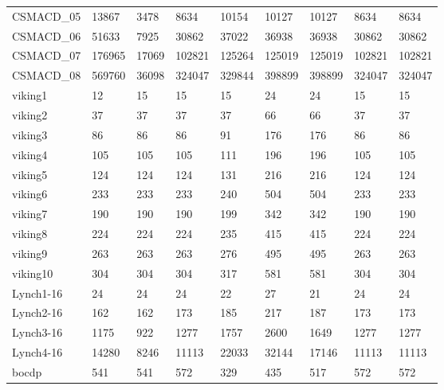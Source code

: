 \begin{table}
\begin{adjustbox}{max totalheight=\textheight}
\begin{tabular}{|l|ll|llllll|}
    CSMACD\_05         & 13867  & 3478     & 8634   & 10154  & 10127  & 10127  & 8634   & 8634   \\
    CSMACD\_06         & 51633  & 7925     & 30862  & 37022  & 36938  & 36938  & 30862  & 30862  \\
    CSMACD\_07         & 176965 & 17069    & 102821 & 125264 & 125019 & 125019 & 102821 & 102821 \\
    CSMACD\_08         & 569760 & 36098    & 324047 & 329844 & 398899 & 398899 & 324047 & 324047 \\ \hline
    viking1            & 12     & 15       & 15     & 15     & 24     & 24     & 15     & 15     \\
    viking2            & 37     & 37       & 37     & 37     & 66     & 66     & 37     & 37     \\
    viking3            & 86     & 86       & 86     & 91     & 176    & 176    & 86     & 86     \\
    viking4            & 105    & 105      & 105    & 111    & 196    & 196    & 105    & 105    \\
    viking5            & 124    & 124      & 124    & 131    & 216    & 216    & 124    & 124    \\
    viking6            & 233    & 233      & 233    & 240    & 504    & 504    & 233    & 233    \\
    viking7            & 190    & 190      & 190    & 199    & 342    & 342    & 190    & 190    \\
    viking8            & 224    & 224      & 224    & 235    & 415    & 415    & 224    & 224    \\
    viking9            & 263    & 263      & 263    & 276    & 495    & 495    & 263    & 263    \\
    viking10           & 304    & 304      & 304    & 317    & 581    & 581    & 304    & 304    \\ \hline
    Lynch1-16          & 24     & 24       & 24     & 22     & 27     & 21     & 24     & 24     \\
    Lynch2-16          & 162    & 162      & 173    & 185    & 217    & 187    & 173    & 173    \\
    Lynch3-16          & 1175   & 922      & 1277   & 1757   & 2600   & 1649   & 1277   & 1277   \\
    Lynch4-16          & 14280  & 8246     & 11113  & 22033  & 32144  & 17146  & 11113  & 11113  \\ \hline
    bocdp              & 541    & 541      & 572    & 329    & 435    & 517    & 572    & 572    \\

\end{tabular}
\end{adjustbox}
\end{table}
